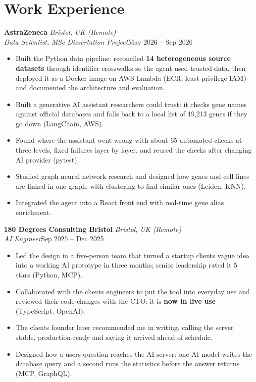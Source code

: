 \documentclass[a4paper,11pt]{article}
\newcommand{\role}[4]{%
  \textbf{#1}{\color{muted}\,\textperiodcentered\,\textit{#2}}\\
  \textit{#4}\hfill{\color{muted}#3}\par}
\newcommand{\gap}{\vspace{5pt}}
\newcommand{\num}[1]{\textbf{#1}}   %
\begin{document}
\section{Work Experience}
\role{AstraZeneca}{Bristol, UK (Remote)}{May 2026 – Sep 2026}{Data Scientist, MSc Dissertation Project}
\begin{itemize}
  \item Built the Python data pipeline: reconciled \num{14 heterogeneous source datasets} through identifier crosswalks so the agent used trusted data, then deployed it as a Docker image on AWS Lambda (ECR, least-privilege IAM) and documented the architecture and evaluation.
  \item Built a generative AI assistant researchers could trust: it checks gene names against official databases and falls back to a local list of 19,213 genes if they go down (LangChain, AWS).
  \item Found where the assistant went wrong with about 65 automated checks at three levels, fixed failures layer by layer, and reused the checks after changing AI provider (pytest).
  \item Studied graph neural network research and designed how genes and cell lines are linked in one graph, with clustering to find similar ones (Leiden, KNN).
  \item Integrated the agent into a React front end with real-time gene alias enrichment.
\end{itemize}
\gap
{}
\role{180 Degrees Consulting Bristol}{Bristol, UK (Remote)}{Sep 2025 – Dec 2025}{AI Engineer}
\begin{itemize}
  \item Led the design in a five-person team that turned a startup client\textquotesingle{}s vague idea into a working AI prototype in three months; senior leadership rated it 5 stars (Python, MCP).
  \item Collaborated with the client\textquotesingle{}s engineers to put the tool into everyday use and reviewed their code changes with the CTO; it is \num{now in live use} (TypeScript, OpenAI).
  \item The client\textquotesingle{}s founder later recommended me in writing, calling the server \textquotesingle{}stable, production-ready\textquotesingle{} and saying it arrived ahead of schedule.
  \item Designed how a user\textquotesingle{}s question reaches the AI server: one AI model writes the database query and a second runs the statistics before the answer returns (MCP, GraphQL).
\end{itemize}
\end{document}
